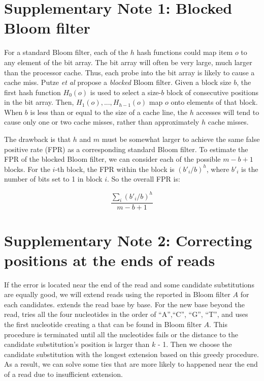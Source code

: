 \documentclass[10pt]{article}
\begin{document}

\section*{Supplementary Note 1: Blocked Bloom filter}

For a standard Bloom filter, each of the $h$ hash functions could map item $o$ to any element of the bit array. The bit array will often be very large, much larger than the processor cache.  Thus, each probe into the bit array is likely to cause a cache miss. Putze \emph{et al} \cite{Putze:2010:CHS:1498698.1594230} propose a \emph{blocked} Bloom filter. Given a block size $b$, the first hash function $H_0(o)$ is used to select a size-$b$ block of consecutive positions in the bit array.  Then, $H_1(o),...,H_{h-1}(o)$ map $o$ onto elements of that block. When $b$ is less than or equal to the size of a cache line, the $h$ accesses will tend to cause only one or two cache misses, rather than approximately $h$ cache misses.

The drawback is that $h$ and $m$ must be somewhat larger to achieve the same false positive rate (FPR) as a corresponding standard Bloom filter.  To estimate the FPR of the blocked Bloom filter, we can consider each of the possible $m-b+1$ blocks. For the $i$-th block, the FPR within the block is $(b'_i/b)^h$, where $b'_i$ is the number of bits set to 1 in block $i$. So the overall FPR is:

$$\frac{\sum_i (b'_i/b)^h}{m-b+1}$$

\section*{Supplementary Note 2: Correcting positions at the ends of reads}

If the error is located near the end of the read and some candidate substitutions are equally good, we will extend reads using the \kmer reported in Bloom filter $A$ for each candidates.
\tool extends the read base by base.
For the new base beyond the read, \tool tries all the four nucleotides in the order of ``A'',``C'', ``G'', ``T'', and uses the first nucleotide creating a \kmer that can be found in Bloom filter $A$.
This procedure is terminated until all the nucleotides fails or the distance to the candidate substitution's position is larger than $k$ - 1.
Then we choose the candidate substitution with the longest extension based on this greedy procedure.
As a result, we can solve some ties that are more likely to happened near the end of a read due to insufficient extension. 
\end{document}

